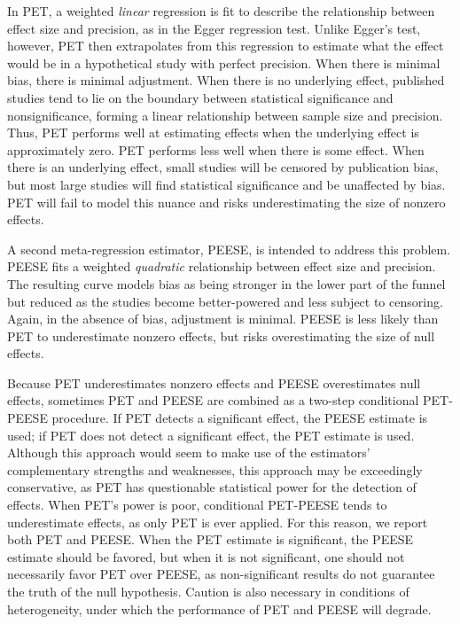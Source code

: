 \documentclass[man, mask]{apa6}
\begin{document}
In PET, a weighted {\em linear} regression is fit to describe the relationship between effect size and precision, as in the Egger regression test. Unlike Egger's test, however, PET then extrapolates from this regression to estimate what the effect would be in a hypothetical study with perfect precision. When there is minimal bias, there is minimal adjustment. When there is no underlying effect, published studies tend to lie on the boundary between statistical significance and nonsignificance, forming a linear relationship between sample size and precision. Thus, PET performs well at estimating effects when the underlying effect is approximately zero. PET performs less well when there is some effect. When there is an underlying effect, small studies will be censored by publication bias, but most large studies will find statistical significance and be unaffected by bias. PET will fail to model this nuance and risks underestimating the size of nonzero effects.

A second meta-regression estimator, PEESE, is intended to address this problem. PEESE fits a weighted {\em quadratic} relationship between effect size and precision. The resulting curve models bias as being stronger in the lower part of the funnel but reduced as the studies become better-powered and less subject to censoring. Again, in the absence of bias, adjustment is minimal. PEESE is less likely than PET to underestimate nonzero effects, but risks overestimating the size of null effects.

Because PET underestimates nonzero effects and PEESE overestimates null effects, sometimes PET and PEESE are combined as a two-step conditional PET-PEESE procedure. If PET detects a significant effect, the PEESE estimate is used; if PET does not detect a significant effect, the PET estimate is used. Although this approach would seem to make use of the estimators' complementary strengths and weaknesses, this approach may be exceedingly conservative, as PET has questionable statistical power for the detection of effects. When PET's power is poor, conditional PET-PEESE tends to underestimate effects, as only PET is ever applied. For this reason, we report both PET and PEESE. When the PET estimate is significant, the PEESE estimate should be favored, but when it is not significant, one should not necessarily favor PET over PEESE, as non-significant results do not guarantee the truth of the null hypothesis. Caution is also necessary in conditions of heterogeneity, under which the performance of PET and PEESE will degrade.
\end{document}
